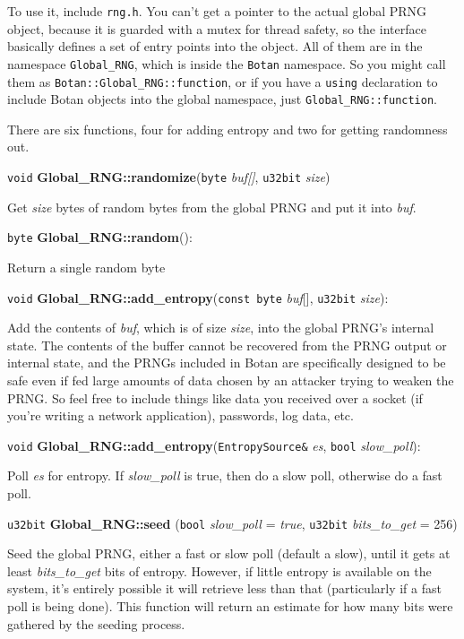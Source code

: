 \documentclass{article}
\newcommand{\filename}[1]{\texttt{#1}}
\newcommand{\function}[1]{\textbf{#1}}
\newcommand{\keyword}[1]{\texttt{#1}}
\newcommand{\type}[1]{\texttt{#1}}
\renewcommand{\arg}[1]{\textsl{#1}}
\newcommand{\namespace}[1]{\texttt{#1}}
\begin{document}
To use it, include \filename{rng.h}. You can't get a pointer to the actual
global PRNG object, because it is guarded with a mutex for thread safety, so
the interface basically defines a set of entry points into the object. All of
them are in the namespace \namespace{Global\_RNG}, which is inside the
\namespace{Botan} namespace. So you might call them as
\texttt{Botan::Global\_RNG::function}, or if you have a \keyword{using}
declaration to include Botan objects into the global namespace, just
\texttt{Global\_RNG::function}.

There are six functions, four for adding entropy and two for getting
randomness out.

\vskip 5pt
\noindent
\type{void} \function{Global\_RNG::randomize}(\type{byte} \arg{buf[]},
                                              \type{u32bit} \arg{size})

Get \arg{size} bytes of random bytes from the global PRNG and put it into
\arg{buf}.

\vskip 5pt
\noindent
\type{byte} \function{Global\_RNG::random}():

Return a single random byte

\vskip 5pt
\noindent
\type{void} \function{Global\_RNG::add\_entropy}(\type{const byte} \arg{buf}[],
                                                 \type{u32bit} \arg{size}):

Add the contents of \arg{buf}, which is of size \arg{size}, into the global
PRNG's internal state. The contents of the buffer cannot be recovered from the
PRNG output or internal state, and the PRNGs included in Botan are specifically
designed to be safe even if fed large amounts of data chosen by an attacker
trying to weaken the PRNG. So feel free to include things like data you
received over a socket (if you're writing a network application), passwords,
log data, etc.

\vskip 5pt
\noindent
\type{void} \function{Global\_RNG::add\_entropy}(\type{EntropySource\&}
                        \arg{es}, \type{bool} \arg{slow\_poll}):

Poll \arg{es} for entropy. If \arg{slow\_poll} is true, then do a slow poll,
otherwise do a fast poll.

\vskip 5pt
\noindent
\type{u32bit} \function{Global\_RNG::seed}
(\type{bool} \arg{slow\_poll} = \arg{true},
 \type{u32bit} \arg{bits\_to\_get} = 256)

Seed the global PRNG, either a fast or slow poll (default a slow), until it
gets at least \arg{bits\_to\_get} bits of entropy. However, if little entropy
is available on the system, it's entirely possible it will retrieve less than
that (particularly if a fast poll is being done). This function will return an
estimate for how many bits were gathered by the seeding process.
\end{document}
